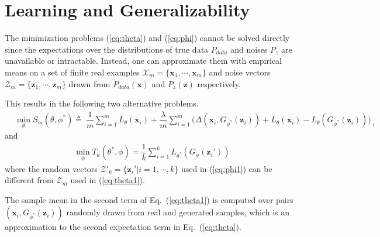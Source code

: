 \section{Learning and Generalizability}\label{sec:alg}
The minimization problems (\ref{eq:theta}) and (\ref{eq:phi}) cannot be solved directly since the expectations over the distributions of true data $P_{data}$ and noises $P_z$ are unavailable or intractable.  Instead, one can approximate them with empirical means on a set of finite real examples $\mathcal X_m=\{\mathbf x_1,\cdots,\mathbf x_m\}$ and noise vectors $\mathcal Z_m=\{\mathbf z_1,\cdots,\mathbf z_m\}$ drawn from $P_{data}(\mathbf x)$ and $P_z(\mathbf z)$ respectively.

This results in the following two alternative problems.
\begin{align}\label{eq:theta1}
&\min_{\theta} S_{m} (\theta,\phi^*) \triangleq ~\dfrac{1}{m} \sum_{i=1}^m {L_\theta(\mathbf x_i)}
+ \dfrac{\lambda}{m} \sum_{i=1}^{m} \big( \Delta(\mathbf x_i,G_{\phi^*}(\mathbf z_i)) + L_\theta(\mathbf x_i) - L_\theta(G_{\phi^*}(\mathbf z_i)) \big)_+%
\end{align}
and
\begin{equation}\label{eq:phi1}
\begin{aligned}
\min_{\phi} T_k(\theta^*,\phi)=\dfrac{1}{k} \sum_{i=1}^k L_{\theta^*}(G_\phi(\mathbf z_i'))
\end{aligned}
\end{equation}
where the random vectors $\mathcal Z'_k=\{\mathbf z_i'|i=1,\cdots,k\}$ used in (\ref{eq:phi1}) can be different from $\mathcal Z_m$ used in (\ref{eq:theta1}).

The sample mean in the second term of Eq.~(\ref{eq:theta1}) is computed over pairs $(\mathbf x_i, G_{\phi^*}(\mathbf z_i))$ randomly drawn from real and generated samples, which is an approximation to the second expectation term in Eq.~(\ref{eq:theta}).

